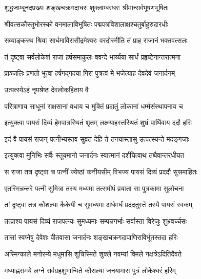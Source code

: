 \twolineshloka
{शुद्धजाम्बूनदप्रख्यः शङ्खचक्रगदाधरः}
{शुक्लाम्बरधरः श्रीमान्सर्वभूषणभूषितः}%

\twolineshloka
{श्रीवत्सकौस्तुभोरस्को वनमालाविभूषितः}
{पद्मपत्रविशालाक्षश्चतुर्बाहुरुदारधीः}%

\twolineshloka
{सव्याङ्कस्थ श्रिया सार्धमाविरासीद्रमेश्वरः}
{वरदोस्मीति तं प्राह राजानं भक्तवत्सलः}%

\twolineshloka
{तं दृष्ट्वा सर्वलोकेशं राजा हर्षसमाकुलः}
{ववन्दे भार्य्यया सार्धं प्रहृष्टेनान्तरात्मना}%

\twolineshloka
{प्राञ्जलिः प्रणतो भूत्वा हर्षगद्गदया गिरा}
{पुत्रत्वं मे भजेत्याह देवदेवं जनार्दनम्}%


\onelineshloka
{उत्पत्स्येऽहं नृपश्रेष्ठ देवलोकहिताय वै}%

\twolineshloka
{परित्राणाय साधूनां राक्षसानां वधाय च}
{मुक्तिं प्रदातुं लोकानां धर्म्मसंस्थापनाय च}%


\twolineshloka
{इत्युक्त्वा पायसं दिव्यं हेमपात्रस्थितं शृतम्}
{लक्ष्म्याहस्तस्थितं शुभ्रं पार्थिवाय ददौ हरिः}%


\twolineshloka
{इदं वै पायसं राजन् पत्नीभ्यस्तव सुव्रत}
{देहि ते तनयास्तासु उत्पत्स्यन्ते मदङ्गजाः}%


\twolineshloka
{इत्युक्त्वा मुनिभिः सर्वैः स्तूयमानो जनार्दनः}
{स्वात्मानं दर्शयित्वाथ तथैवान्तरधीयत}%

\twolineshloka
{स राजा तत्र दृष्ट्वा च पत्नीं ज्येष्ठां कनीयसीम्}
{विभज्य पायसं दिव्यं प्रददौ सुसमाहितः}%

\twolineshloka
{एतस्मिन्नन्तरे पत्नी सुमित्रा तस्य मध्यमा}
{तत्समीपं प्रयाता सा पुत्रकामा सुलोचना}%

\twolineshloka
{तां दृष्ट्वा तत्र कौशल्या कैकेयी च सुमध्यमा}
{अर्धमर्धं प्रददतुस्ते तस्यै पायसं स्वकम्}%

\twolineshloka
{तत्प्राश्य पायसं दिव्यं राजपत्न्यः सुमध्यमाः}
{सम्पन्नगर्भाः सर्वास्ता विरेजुः शुभ्रवर्च्चसः}%

\twolineshloka
{तासां स्वप्नेषु देवेशः पीतवासा जनार्दनः}
{शङ्खचक्रगदापाणिराविर्भूतस्तदा हरिः}%

\twolineshloka
{अस्मिन्काले मनोरम्ये मधुमासि शुचिस्मिते}
{शुक्ले नवम्यां विमले नक्षत्रेऽदितिदैवते}%

\twolineshloka
{मध्याह्नसमये लग्ने सर्वग्रहशुभान्विते}
{कौसल्या जनयामास पुत्रं लोकेश्वरं हरिम्}%

